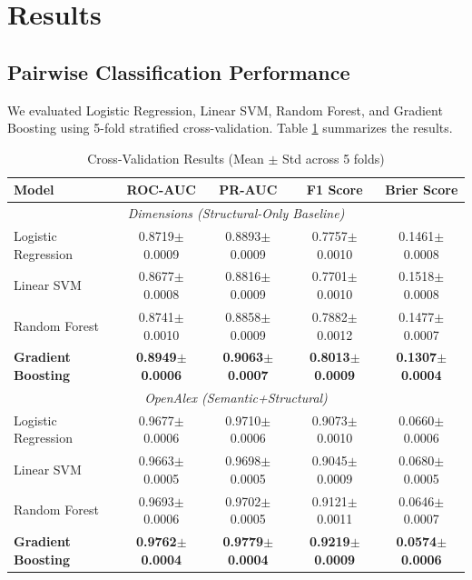 \documentclass[11pt,a4paper]{article}
\begin{document}
\section{Results}
\label{sec:results}

\subsection{Pairwise Classification Performance}
We evaluated Logistic Regression, Linear SVM, Random Forest, and Gradient Boosting using 5-fold stratified cross-validation. Table \ref{tab:cv} summarizes the results.

\begin{table}[H]
\centering
\caption{Cross-Validation Results (Mean $\pm$ Std across 5 folds)}
\label{tab:cv}
\begin{tabular}{lcccc}
\toprule
\textbf{Model} & \textbf{ROC-AUC} & \textbf{PR-AUC} & \textbf{F1 Score} & \textbf{Brier Score} \\
\midrule
\multicolumn{5}{c}{\textit{Dimensions (Structural-Only Baseline)}} \\
Logistic Regression & 0.8719$\pm$0.0009 & 0.8893$\pm$0.0009 & 0.7757$\pm$0.0010 & 0.1461$\pm$0.0008 \\
Linear SVM & 0.8677$\pm$0.0008 & 0.8816$\pm$0.0009 & 0.7701$\pm$0.0010 & 0.1518$\pm$0.0008 \\
Random Forest & 0.8741$\pm$0.0010 & 0.8858$\pm$0.0009 & 0.7882$\pm$0.0012 & 0.1477$\pm$0.0007 \\
\textbf{Gradient Boosting} & \textbf{0.8949$\pm$0.0006} & \textbf{0.9063$\pm$0.0007} & \textbf{0.8013$\pm$0.0009} & \textbf{0.1307$\pm$0.0004} \\
\midrule
\multicolumn{5}{c}{\textit{OpenAlex (Semantic+Structural)}} \\
Logistic Regression & 0.9677$\pm$0.0006 & 0.9710$\pm$0.0006 & 0.9073$\pm$0.0010 & 0.0660$\pm$0.0006 \\
Linear SVM & 0.9663$\pm$0.0005 & 0.9698$\pm$0.0005 & 0.9045$\pm$0.0009 & 0.0680$\pm$0.0005 \\
Random Forest & 0.9693$\pm$0.0006 & 0.9702$\pm$0.0005 & 0.9121$\pm$0.0011 & 0.0646$\pm$0.0007 \\
\textbf{Gradient Boosting} & \textbf{0.9762$\pm$0.0004} & \textbf{0.9779$\pm$0.0004} & \textbf{0.9219$\pm$0.0009} & \textbf{0.0574$\pm$0.0006} \\
\bottomrule
\end{tabular}
\end{table}
\end{document}
